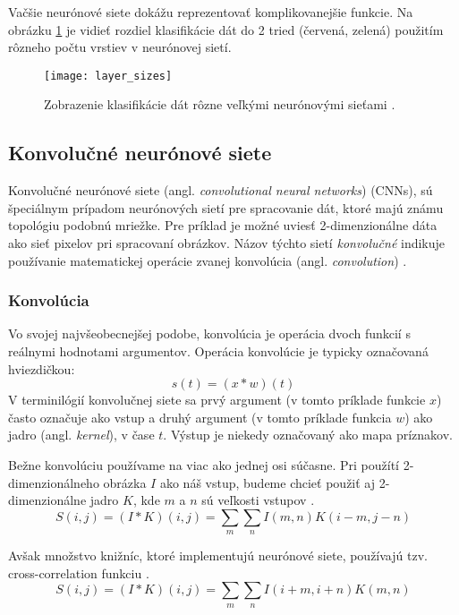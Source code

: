 Vačšie neurónové siete dokážu reprezentovať komplikovanejšie funkcie.
Na obrázku \ref{pic:XNNLayerExample} je vidieť rozdiel klasifikácie dát do 2 tried (červená, zelená) použitím rôzneho počtu vrstiev v neurónovej sietí.
\begin{figure}[H]
	\centering
	\texttt{[image: layer\_sizes]}
	\caption{Zobrazenie klasifikácie dát rôzne veľkými neurónovými sieťami \cite{odkaz:ConvolutionalNeuralNetworkCS231n}.}
	\label{pic:XNNLayerExample}
\end{figure}

\subsection{Konvolučné neurónové siete}
\label{subsec:convolutionalneuralnetwork}
Konvolučné neurónové siete (angl. \textit{convolutional neural networks}) (CNNs), sú špeciálnym prípadom neurónových sietí pre spracovanie
    dát, ktoré majú známu topológiu podobnú mriežke.
Pre príklad je možné uviesť 2-dimenzionálne dáta ako sieť pixelov pri spracovaní obrázkov.
Názov týchto sietí \textit{konvolučné} indikuje používanie matematickej operácie zvanej konvolúcia (angl. \textit{convolution}) \cite{book:Goodfellow-et-al-2016}.

\subsubsection{Konvolúcia}
Vo svojej najvšeobecnejšej podobe, konvolúcia je operácia dvoch funkcií s reálnymi hodnotami argumentov.
Operácia konvolúcie je typicky označovaná hviezdičkou:
\begin{equation}
    s(t) = (x * w)(t)
\end{equation}
V terminilógií konvolučnej siete sa prvý argument (v tomto príklade funkcie $x$) často označuje ako vstup a druhý
    argument (v tomto príklade funkcia $w$) ako jadro (angl. \textit{kernel}), v čase $t$. Výstup je niekedy označovaný ako mapa príznakov.

Bežne konvolúciu používame na viac ako jednej osi súčasne.
Pri použítí 2-dimenzionálneho obrázka $I$ ako náš vstup, budeme chcieť použiť aj 2-dimenzionálne jadro $K$, kde $m$ a $n$ sú veľkosti vstupov \cite{book:Goodfellow-et-al-2016}.
\begin{equation}
    S(i,j) = (I * K)(i, j) = \sum_m \sum_n I(m,n) K(i - m, j - n)
\end{equation}

Avšak množstvo knižníc, ktoré implementujú neurónové siete, používajú tzv. cross-correlation funkciu \cite{book:Goodfellow-et-al-2016}.
\begin{equation}
    S(i,j) = (I * K)(i, j) = \sum_m \sum_n I(i + m, i + n) K(m, n)
\end{equation}

